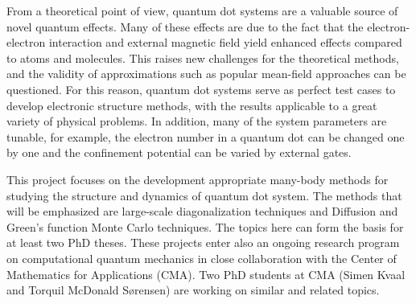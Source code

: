 From a theoretical point
of view, quantum dot systems are a valuable source of novel
quantum effects. Many of these effects are due to the  fact that the
electron-electron interaction and external magnetic field yield enhanced effects compared 
to atoms and molecules.  This raises new
challenges for the theoretical methods, and the validity of
approximations such as popular mean-field approaches can be questioned. For this reason,
quantum dot systems serve as perfect test cases to develop electronic structure
methods, with the results applicable to a great variety of physical
problems. In addition, many
of the system parameters are tunable, for example, the electron number in a quantum dot
can be changed one by one and the confinement potential can be varied
by external gates.


This project focuses on the development appropriate many-body methods for studying the
structure and dynamics of quantum dot system. The methods that will be emphasized are large-scale
diagonalization techniques and Diffusion and Green's function Monte Carlo techniques. 
The topics here can form the basis for at least two PhD theses. These projects enter also an ongoing
research program on computational quantum mechanics in close collaboration with the Center of Mathematics
for Applications (CMA). Two PhD students at CMA (Simen Kvaal and Torquil McDonald S\o rensen) are working
on similar and related topics.

